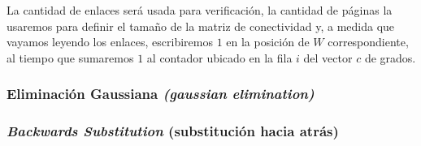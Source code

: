 		La cantidad de enlaces será usada para verificación, la cantidad de páginas la usaremos para definir el tamaño de la matriz de conectividad y, a medida que vayamos leyendo los enlaces, escribiremos $1$ en la posición de $W$ correspondiente, al tiempo que sumaremos $1$ al contador ubicado en la fila $i$ del vector $c$ de grados. \\


		\subsubsection{Eliminación Gaussiana \textit{(gaussian elimination)}}



		\subsubsection{\textit{Backwards Substitution} (substitución hacia atrás)}



